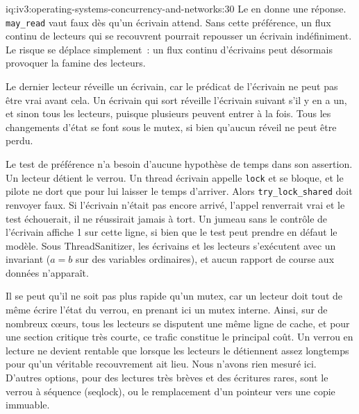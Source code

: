 \begin{solution}{iq:iv3:operating-systems-concurrency-and-networks:30}
Le  en donne une réponse. \texttt{may\_read} vaut faux dès qu'un écrivain attend. Sans cette préférence, un flux continu de lecteurs qui se recouvrent pourrait repousser un écrivain indéfiniment. Le risque se déplace simplement~: un flux continu d'écrivains peut désormais provoquer la famine des lecteurs.
\label{lst:iv3:os:rwlock}

Le dernier lecteur réveille un écrivain, car le prédicat de l'écrivain ne peut pas être vrai avant cela. Un écrivain qui sort réveille l'écrivain suivant s'il y en a un, et sinon tous les lecteurs, puisque plusieurs peuvent entrer à la fois. Tous les changements d'état se font sous le mutex, si bien qu'aucun réveil ne peut être perdu.

Le test de préférence n'a besoin d'aucune hypothèse de temps dans son assertion. Un lecteur détient le verrou. Un thread écrivain appelle \texttt{lock} et se bloque, et le pilote ne dort que pour lui laisser le temps d'arriver. Alors \texttt{try\_lock\_shared} doit renvoyer faux. Si l'écrivain n'était pas encore arrivé, l'appel renverrait vrai et le test échouerait, il ne réussirait jamais à tort. Un jumeau sans le contrôle de l'écrivain affiche 1 sur cette ligne, si bien que le test peut prendre en défaut le modèle. Sous ThreadSanitizer, les écrivains et les lecteurs s'exécutent avec un invariant ($a = b$ sur des variables ordinaires), et aucun rapport de course aux données n'apparaît.

Il se peut qu'il ne soit pas plus rapide qu'un mutex, car un lecteur doit tout de même écrire l'état du verrou, en prenant ici un mutex interne. Ainsi, sur de nombreux cœurs, tous les lecteurs se disputent une même ligne de cache, et pour une section critique très courte, ce trafic constitue le principal coût. Un verrou en lecture ne devient rentable que lorsque les lecteurs le détiennent assez longtemps pour qu'un véritable recouvrement ait lieu. Nous n'avons rien mesuré ici. D'autres options, pour des lectures très brèves et des écritures rares, sont le verrou à séquence (seqlock), ou le remplacement d'un pointeur vers une copie immuable.

\end{solution}

